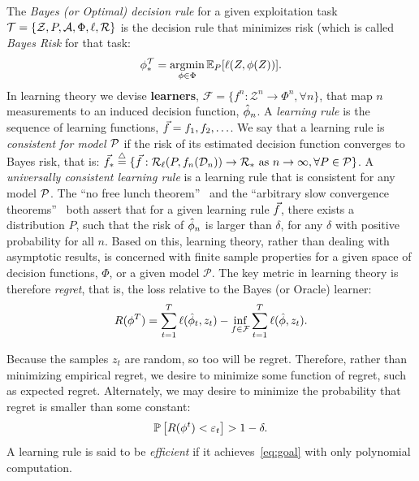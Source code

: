\documentclass{article}
\begin{document}
\noindent  The \emph{Bayes (or Optimal) decision rule} for a given exploitation task $\mathcal{T}=\{\mathcal{Z}, P, \mathcal{A}, \Phi, \ell, \mathcal{R}\}$ is the decision rule that minimizes risk (which is called \emph{Bayes Risk} for that task: 
\begin{align}
    \phi_*^\mathcal{T} = \argmin_{\phi \in \Phi} \EE_P [\ell(Z, \phi(Z))].
\end{align}
In learning theory we devise  \textbf{learners}, $\mathcal{F} = \{f^n : \mathcal{Z}^n \to \Phi^n, \forall n\}$, that map $n$ measurements to an induced decision function, $\hat{\phi}_n$. 
A \emph{learning rule} is the sequence of learning functions, $\vec{f}= f_1,f_2,\ldots$.  We say that a learning rule is \emph{consistent for model $\mathcal{P}$} if the risk of its estimated decision function converges to Bayes risk, that is:
$\vec{f}_* \overset{\triangle}{=} \{ \vec{f} : \mathcal{R}_\ell(P,f_n(\mathcal{D}_n)) \to \mathcal{R}_* \text{ as } n \rightarrow \infty, \forall P \in \mathcal{P} \}$.
A \emph{universally consistent learning rule} is a learning rule that is consistent for any model $\mathcal{P}$. 
%
The ``no free lunch theorem''~\cite{Wolpert1996} and the ``arbitrary slow convergence theorems''~\cite{Devroye1993} both assert that for a given learning rule $\vec{f}$, there exists a distribution $P$, such that the risk of $\hat{\phi}_n$ is larger than $\delta$, for any $\delta$ with positive probability for all $n$.   Based on this,   learning theory, rather than dealing with asymptotic results, is concerned with finite sample properties for a given space of decision functions, $\Phi$, or a given model $\mathcal{P}$. 
The key metric in  learning theory is therefore \emph{regret}, that is, the loss relative to the Bayes (or Oracle) learner:
\begin{align}
    R(\phi^T) = \sum_{t=1}^T \ell(\hat{\phi}_t, z_t) - \inf_{f \in \mathcal{F}} \sum_{t=1}^T \ell ( \hat{\phi}, z_t).
\end{align}

Because the samples $z_t$ are random, so too will be regret.  Therefore, rather than minimizing empirical regret, we desire to minimize some function of regret, such as expected regret. 
% 
Alternately, we may desire to minimize the probability that regret is smaller than some constant:
\begin{align} \label{eq:goal}
    \mathbb{P} \left[R(\phi^t)  < \varepsilon_t \right] > 1 - \delta.
\end{align}
A learning rule is said to be \emph{efficient} if it achieves~\eqref{eq:goal} with only polynomial computation.  
\end{document}
